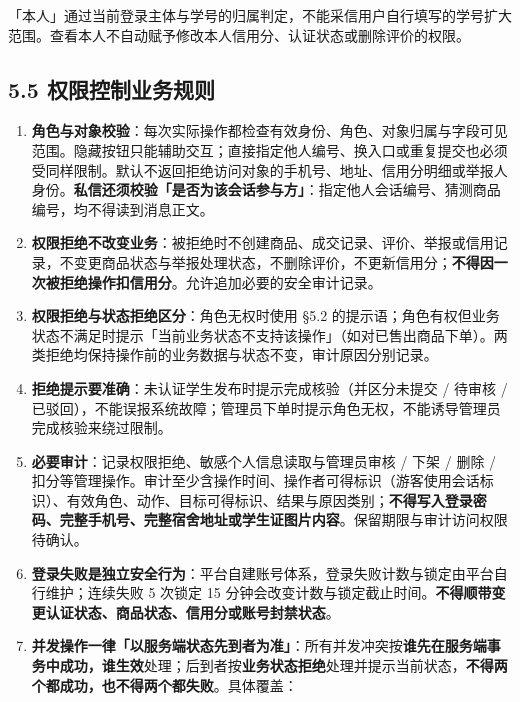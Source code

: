 \documentclass[12pt,a4paper]{ctexart}
\begin{document}
「本人」通过当前登录主体与学号的归属判定，不能采信用户自行填写的学号扩大范围。查看本人不自动赋予修改本人信用分、认证状态或删除评价的权限。


\subsection*{5.5 权限控制业务规则}

\begin{enumerate}[leftmargin=1.9em,itemsep=1pt,topsep=2pt]
\item \textbf{角色与对象校验}：每次实际操作都检查有效身份、角色、对象归属与字段可见范围。隐藏按钮只能辅助交互；直接指定他人编号、换入口或重复提交也必须受同样限制。默认不返回拒绝访问对象的手机号、地址、信用分明细或举报人身份。\textbf{私信还须校验「是否为该会话参与方」}：指定他人会话编号、猜测商品编号，均不得读到消息正文。
\item \textbf{权限拒绝不改变业务}：被拒绝时不创建商品、成交记录、评价、举报或信用记录，不变更商品状态与举报处理状态，不删除评价，不更新信用分；\textbf{不得因一次被拒绝操作扣信用分}。允许追加必要的安全审计记录。
\item \textbf{权限拒绝与状态拒绝区分}：角色无权时使用 §5.2 的提示语；角色有权但业务状态不满足时提示「当前业务状态不支持该操作」（如对已售出商品下单）。两类拒绝均保持操作前的业务数据与状态不变，审计原因分别记录。
\item \textbf{拒绝提示要准确}：未认证学生发布时提示完成核验（并区分未提交 / 待审核 / 已驳回），不能误报系统故障；管理员下单时提示角色无权，不能诱导管理员完成核验来绕过限制。
\item \textbf{必要审计}：记录权限拒绝、敏感个人信息读取与管理员审核 / 下架 / 删除 / 扣分等管理操作。审计至少含操作时间、操作者可得标识（游客使用会话标识）、有效角色、动作、目标可得标识、结果与原因类别；\textbf{不得写入登录密码、完整手机号、完整宿舍地址或学生证图片内容}。保留期限与审计访问权限待确认。
\item \textbf{登录失败是独立安全行为}：平台自建账号体系，登录失败计数与锁定由平台自行维护；连续失败 5 次锁定 15 分钟会改变计数与锁定截止时间。\textbf{不得顺带变更认证状态、商品状态、信用分或账号封禁状态}。
\item \textbf{并发操作一律「以服务端状态先到者为准」}：所有并发冲突按\textbf{谁先在服务端事务中成功，谁生效}处理；后到者按\textbf{业务状态拒绝}处理并提示当前状态，\textbf{不得两个都成功，也不得两个都失败}。具体覆盖：
\end{enumerate}
\end{document}
